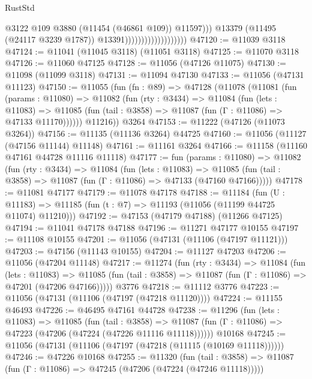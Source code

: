 \begin{lexlean}{RustStd}
\begin{coremodule}
                                                @3122
                                                @109
                                                @3880
                                                (@11454 (@46861 @109))
                                                @11597)))
                                          @13379
                                          (@11495 (@24117 @3239 @1787))
                                          @13391)))))))))))))))))))
@47120 := @11039 @3118
@47124 := @11041 (@11045 @3118) (@11051 @3118)
@47125 := @11070 @3118
@47126 := @11060 @47125
@47128 := @11056 (@47126 @11075)
@47130 := @11098 (@11099 @3118)
@47131 := @11094 @47130
@47133 := @11056 (@47131 @11123)
@47150 := @11055
    (fun (fn : @89) =>
    @47128
      (@11078
        (@11081
          (fun (params : @11080) =>
          @11082
            (fun (rty : @3434) =>
            @11084
              (fun (lets : @11083) =>
              @11085 (fun (tail : @3858) => @11087 (fun (Γ : @11086) => @47133 @11170))))))
        @11216))
    @3264
@47153 := @11222 (@47126 (@11073 @3264))
@47156 := @11135 (@11136 @3264) @44725
@47160 := @11056 (@11127 (@47156 @11144) @11148)
@47161 := @11161 @3264
@47166 := @11158 (@11160 @47161 @44728 @11116 @11118)
@47177 := fun (params : @11080) =>
  @11082
    (fun (rty : @3434) =>
    @11084
      (fun (lets : @11083) =>
      @11085 (fun (tail : @3858) => @11087 (fun (Γ : @11086) => @47133 (@47160 @47166)))))
@47178 := @11081 @47177
@47179 := @11078 @47178
@47188 := @11184
    (fun (U : @11183) => @11185 (fun (t : @7) => @11193 (@11056 (@11199 @44725 @11074) @11210)))
@47192 := @47153 (@47179 @47188) (@11266 @47125)
@47194 := @11041 @47178 @47188
@47196 := @11271 @47177 @10155
@47197 := @11108 @10155
@47201 := @11056 (@47131 (@11106 (@47197 @11121)))
@47203 := @47156 (@11143 @10155)
@47204 := @11127 @47203
@47206 := @11056 (@47204 @11148)
@47217 := @11274
    (fun (rty : @3434) =>
    @11084
      (fun (lets : @11083) =>
      @11085 (fun (tail : @3858) => @11087 (fun (Γ : @11086) => @47201 (@47206 @47166)))))
    @3776
@47218 := @11112 @3776
@47223 := @11056 (@47131 (@11106 (@47197 (@47218 @11120))))
@47224 := @11155 @46493
@47226 := @46495 @47161 @44728
@47238 := @11296
    (fun (lets : @11083) =>
    @11085
      (fun (tail : @3858) =>
      @11087 (fun (Γ : @11086) => @47223 (@47206 (@47224 (@47226 @11116 @11118))))))
    @10168
@47245 := @11056 (@47131 (@11106 (@47197 (@47218 (@11115 (@10169 @11118))))))
@47246 := @47226 @10168
@47255 := @11320
    (fun (tail : @3858) => @11087 (fun (Γ : @11086) => @47245 (@47206 (@47224 (@47246 @11118)))))

\end{coremodule}
\end{lexlean}
